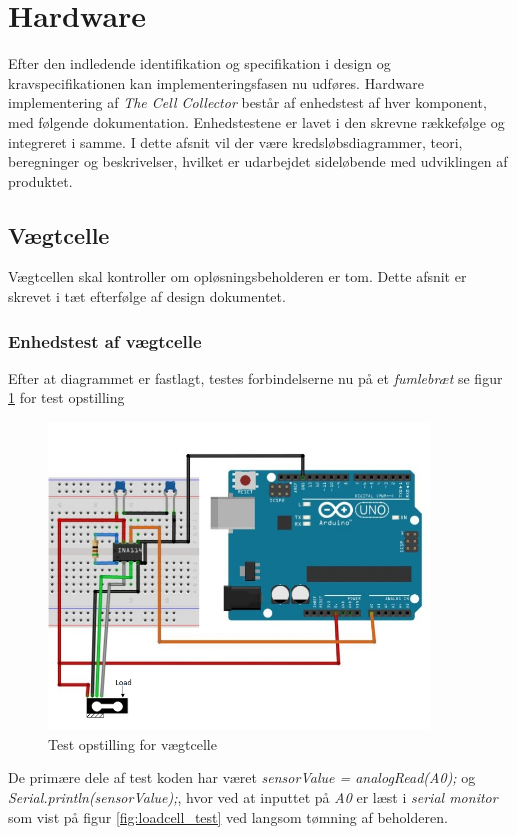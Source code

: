   \section{Hardware}
Efter den indledende identifikation og specifikation i design og kravspecifikationen kan implementeringsfasen nu udføres. Hardware implementering af \textit{The Cell Collector} består af enhedstest af hver komponent, med følgende dokumentation. Enhedstestene er lavet i den skrevne rækkefølge og integreret i samme. I dette afsnit vil der være kredsløbsdiagrammer, teori, beregninger og beskrivelser, hvilket er udarbejdet sideløbende med udviklingen af produktet. 
 	
 \subsection{Vægtcelle}
Vægtcellen skal kontroller om opløsningsbeholderen er tom. Dette afsnit er skrevet i tæt efterfølge af design dokumentet.

\subsubsection{Enhedstest af vægtcelle }

Efter at diagrammet er fastlagt, testes forbindelserne nu på et \textit{fumlebræt} se figur \ref{fig:loadcelltest} for test opstilling

  \begin{figure}[H]
	\centering
	\includegraphics[width=0.9\textwidth]{billeder/Hardware/diagrammer/Drawing1.jpg}
	\caption{Test opstilling for vægtcelle}
	\label{fig:loadcelltest}
\end{figure}
De primære dele af test koden har været  \textit{sensorValue = analogRead(A0);} og \textit{Serial.println(sensorValue);}, hvor ved at inputtet på \textit{A0} er læst i \textit{serial monitor} som vist på figur \ref{fig:loadcell_test} ved langsom tømning af beholderen.

